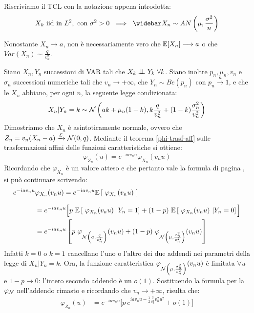 \medskip
\begin{ese}
  Riscriviamo il TCL con la notazione appena introdotta:
  $$
    X_k \text{ iid in } L^2, \text{ con } \sigma^2 > 0 \ \implies \ \widebar X_n \sim AN \left( \mu, \frac{\sigma^2}{n} \right)
  $$
\end{ese}

\medskip
\begin{nb}
  Nonostante $X_n \to a$, non è necessariamente vero che $\mathbb E[X_n] \longrightarrow a$ o che $Var(X_n) \sim \frac{q}{v_n^2}$.
\end{nb}

\medskip
\begin{cese}
	Siano $X_n, Y_n$ successioni di VAR tali che $X_k \indep Y_k \ \forall k$. Siano inoltre $p_n, \mu_n, v_n$ e $\sigma_n$ successioni numeriche tali che $v_n \to +\infty$, che $Y_n \sim Be(p_n)$ con $p_n \xrightarrow{n} 1$, e che le $X_n$ abbiano, per ogni $n$, la seguente legge condizionata:
	$$X_n | Y_n = k \sim \mathcal N \left( ak + \mu_n(1-k), k \frac q {v_n^2} + (1-k) \frac{\sigma_n^2}{v_n^2} \right)$$
	Dimostriamo che $X_n$ è asintoticamente normale, ovvero che $Z_n = v_n(X_n - a) \xrightarrow{\mathcal L} \mathcal N(0,q)$. Mediante il teorema \ref{phi-trasf-aff} sulle trasformazioni affini delle funzioni caratteristiche si ottiene:
	$$ \varphi_{Z_n}(u) = e^{-i a v_n u} \varphi_{X_n}(v_n u)$$
	Ricordando che $\varphi_{X_n}$ è un valore atteso e che pertanto vale la formula di pagina \pageref{formula-att-cond}, si può continuare scrivendo:
	\begin{align*}
		e^{-i a v_n u} &\varphi_{X_n}(v_n u) = e^{-i a v_n u} \mathbb E \left[  \ \varphi_{X_n}(v_n u) \  \right] \\[7pt]
		&= e^{-i a v_n u} \Big[ p \ \mathbb E \left[  \ \varphi_{X_n}(v_n u) \ | Y_n=1  \right] + (1-p) \ \mathbb E \left[  \ \varphi_{X_n}(v_n u) \ | Y_n=0  \right] \Big] \\
		&= e^{-i a v_n u} \left[ p \ \varphi_{\mathcal N \left( a, \frac q {v_n^2} \right) }(v_n u) + (1-p) \ \varphi_{\mathcal N \left( \mu, \frac {\sigma_n^2} {v_n^2} \right)} (v_n u) \right]
	\end{align*}
	Infatti $k=0$ o $k=1$ cancellano l'uno o l'altro dei due addendi nei parametri della legge di $X_n | Y_n = k$. Ora, la funzione caratteristica $\varphi_{\mathcal N \left( \mu, \frac {\sigma_n^2} {v_n^2} \right)} (v_n u)$ è limitata $\forall u$ e $1-p \to 0$: l'intero secondo addendo è un $o(1)$. Sostituendo la formula per la $\varphi_{\mathcal N}$ nell'addendo rimasto e ricordando che $v_n \to +\infty$, risulta che:
	\begin{align*}
		\varphi_{Z_n}(u) &= e^{-i a v_n u} \Big[ p \ e^{i a v_n u - \frac 1 2 \frac q {v_n^2} v_n^2 u^2} + o(1) \Big] \\[7pt]

\end{align*}
\end{cese}
